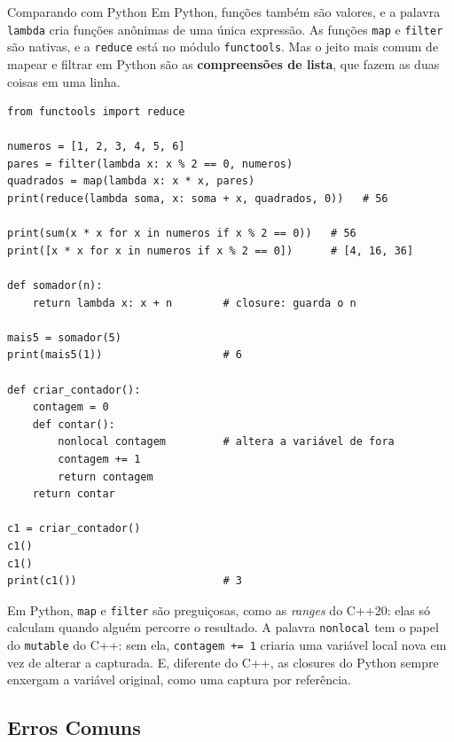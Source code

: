 \begin{destaque}{Comparando com Python}
Em Python, funções também são valores, e a palavra \texttt{lambda} cria funções anônimas de uma única expressão. As funções \texttt{map} e \texttt{filter} são nativas, e a \texttt{reduce} está no módulo \texttt{functools}. Mas o jeito mais comum de mapear e filtrar em Python são as \textbf{compreensões de lista}, que fazem as duas coisas em uma linha.

\begin{codigo}
\begin{Verbatim}[breaklines=true, breaksymbolleft={}, fontsize=\footnotesize]
from functools import reduce

numeros = [1, 2, 3, 4, 5, 6]
pares = filter(lambda x: x % 2 == 0, numeros)
quadrados = map(lambda x: x * x, pares)
print(reduce(lambda soma, x: soma + x, quadrados, 0))   # 56

print(sum(x * x for x in numeros if x % 2 == 0))   # 56
print([x * x for x in numeros if x % 2 == 0])      # [4, 16, 36]

def somador(n):
    return lambda x: x + n        # closure: guarda o n

mais5 = somador(5)
print(mais5(1))                   # 6

def criar_contador():
    contagem = 0
    def contar():
        nonlocal contagem         # altera a variável de fora
        contagem += 1
        return contagem
    return contar

c1 = criar_contador()
c1()
c1()
print(c1())                       # 3
\end{Verbatim}
\end{codigo}

Em Python, \texttt{map} e \texttt{filter} são preguiçosas, como as \textit{ranges} do C++20: elas só calculam quando alguém percorre o resultado. A palavra \texttt{nonlocal} tem o papel do \texttt{mutable} do C++: sem ela, \texttt{contagem += 1} criaria uma variável local nova em vez de alterar a capturada. E, diferente do C++, as closures do Python sempre enxergam a variável original, como uma captura por referência.
\end{destaque}

\subsection{Erros Comuns}

